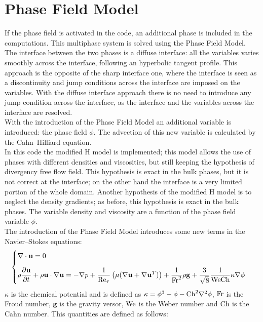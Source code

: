 \section{Phase Field Model}
If the phase field is activated in the code, an additional phase is included in the computations. This multiphase system is solved using the Phase Field Model. The interface between the two phases is a diffuse interface: all the variables varies smoothly across the interface, following an hyperbolic tangent profile. This approach is the opposite of the sharp interface one, where the interface is seen as a discontinuity and jump conditions across the interface are imposed on the variables. With the diffuse interface approach there is no need to introduce any jump condition across the interface, as the interface and the variables across the interface are resolved.\\
With the introduction of the Phase Field Model an additional variable is introduced: the phase field $\phi$. The advection of this new variable is calculated by the Cahn--Hilliard equation. \\
In this code the modified H model is implemented; this model allows the use of phases with different densities and viscosities, but still keeping the hypothesis of divergency free flow field. This hypothesis is exact in the bulk phases, but it is not correct at the interface; on the other hand the interface is a very limited portion of the whole domain. Another hypothesis of the modified H model is to neglect the density gradients; as before, this hypothesis is exact in the bulk phases. The variable density and viscosity are a function of the phase field variable $\phi$.\\
The introduction of the Phase Field Model introduces some new terms in the Navier--Stokes equations:
\begin{equation}
\begin{cases}
\nabla\cdot \mathbf{u}=0\\[2ex]
\rho\dfrac{\partial \mathbf{u}}{\partial t}+\rho\mathbf{u}\cdot\nabla \mathbf{u}=-\nabla p+\dfrac{1}{\textnormal{Re}_\tau}\left( \mu(\nabla\mathbf{u}+\nabla\mathbf{u}^T)  \right)+\dfrac{1}{\textnormal{Fr}^2}\rho\mathbf{g}+\dfrac{3}{\sqrt{8}}\dfrac{1}{\textnormal{We}\textnormal{Ch}}\kappa\nabla\phi
\end{cases}
\end{equation}
$\kappa$ is the chemical potential and is defined as $\kappa=\phi^3-\phi-\textnormal{Ch}^2\nabla^2\phi$, $\textnormal{Fr}$ is the Froud number, $\mathbf{g}$ is the gravity versor, $\textnormal{We}$ is the Weber number and $\textnormal{Ch}$ is the Cahn number. This quantities are defined as follows:
